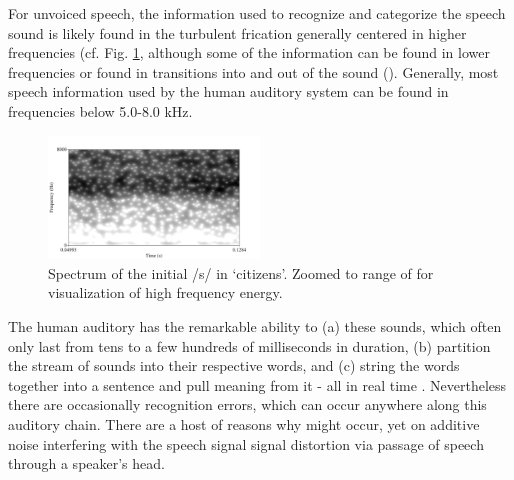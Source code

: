 For unvoiced speech, the information used to recognize and categorize the speech sound is likely found in \DIFdelbegin {}\DIFdelend the turbulent frication generally centered in higher frequencies (cf. Fig. \ref{fig:spctgrm_s}\DIFaddbegin \DIFadd{)}\DIFaddend , although some of the information can be found in lower frequencies \DIFdelbegin \DIFdel{), }\DIFdelend or found in \DIFdelbegin {}\DIFdelend \DIFaddbegin {}\DIFaddend transitions into and out of the sound (\cite{halle:57,lindblom:63,stevens:78,willi:17}).  Generally, most speech information used by the human auditory system can be found in frequencies below 5.0-8.0 kHz.
\DIFaddbegin 

\DIFaddend \begin{figure}
\centering
  \includegraphics[width=0.5\textwidth]{figure/spctgrm_s.png}
  \caption{Spectrum of the initial /s/ in `citizens'. Zoomed to range of \DIFdelbegin {}\DIFdelend \DIFaddbegin {}\DIFaddend for visualization of high frequency energy.}
  \label{fig:spctgrm_s}
\end{figure}
\DIFdelbegin %

\DIFdelend %
The human auditory \DIFdelbegin {}\DIFdelend \DIFaddbegin {}\DIFaddend has the remarkable ability to (a) \DIFdelbegin {}\DIFdelend \DIFaddbegin {}\DIFaddend these sounds, which often only last from tens to a few hundreds of milliseconds in duration, (b) partition the stream of sounds into their respective words, and (c) string the words together into a sentence and pull meaning from it - all in real time \DIFaddbegin {}\DIFaddend .  Nevertheless there are occasionally recognition errors, which can occur anywhere along this auditory chain.  \DIFdelbegin {}\DIFdelend %
There are a host of reasons why \DIFdelbegin {}\DIFdelend \DIFaddbegin {}\DIFaddend might occur, yet \DIFdelbegin {}\DIFdelend \DIFaddbegin {}\DIFaddend on additive noise interfering with the speech signal \DIFdelbegin {}\DIFdelend \DIFaddbegin {}\DIFaddend signal distortion via passage of speech through a speaker's head.


